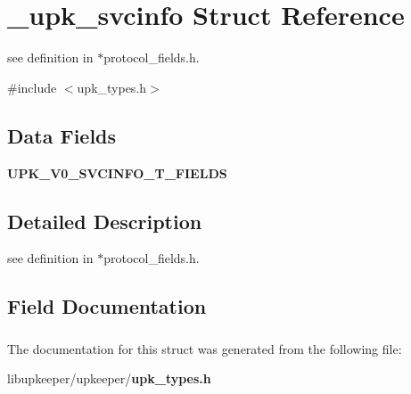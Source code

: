 \section{\_\-upk\_\-svcinfo Struct Reference}
\label{struct__upk__svcinfo}


see definition in $\ast$protocol\_\-fields.h.  




{\ttfamily \#include $<$upk\_\-types.h$>$}

\subsection*{Data Fields}
\begin{DoxyCompactItemize}
\item 
{\bf UPK\_\-V0\_\-SVCINFO\_\-T\_\-FIELDS}
\end{DoxyCompactItemize}


\subsection{Detailed Description}
see definition in $\ast$protocol\_\-fields.h. 

\subsection{Field Documentation}
\subsubsection[{UPK\_\-V0\_\-SVCINFO\_\-T\_\-FIELDS}]{}\label{struct__upk__svcinfo_a663fac69a32271b907e3cd0a6def2e80}


The documentation for this struct was generated from the following file:\begin{DoxyCompactItemize}
\item 
libupkeeper/upkeeper/{\bf upk\_\-types.h}\end{DoxyCompactItemize}
